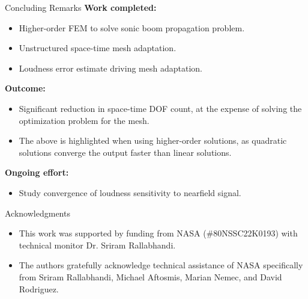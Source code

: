 \documentclass{beamer}
\begin{document}

{

\begin{frame}[t]{Concluding Remarks}
  \textbf{Work completed:}
  \begin{itemize}
    \item Higher-order FEM to solve sonic boom propagation problem.
    \item Unstructured space-time mesh adaptation.
    \item Loudness error estimate driving mesh adaptation.
  \end{itemize}

  {
  \textbf{Outcome:}
  \begin{itemize}
      \item Significant reduction in space-time DOF count, at the expense of solving the optimization problem for the mesh.
      \item The above is highlighted when using higher-order solutions, as quadratic solutions converge the output faster than linear solutions.
    \end{itemize}
  }

  {
    \vspace{15pt}
    \textbf{Ongoing effort:}
    \begin{itemize}
      \item Study convergence of loudness sensitivity to nearfield signal.
    \end{itemize}
  }
\end{frame}


\begin{frame}[t]{Acknowledgments}

  \begin{itemize}
    \item This work was supported by funding from NASA (\#80NSSC22K0193) with technical monitor Dr. Sriram Rallabhandi.
    \item The authors gratefully acknowledge technical assistance of NASA specifically from Sriram Rallabhandi, Michael Aftosmis, Marian Nemec, and David Rodriguez.
  \end{itemize}

\end{frame}

}
\end{document}
